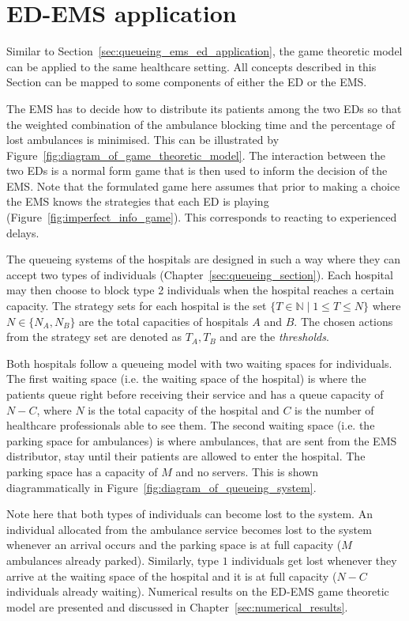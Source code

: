 \section{ED-EMS application}\label{sec:game_ems_ed_application}

Similar to Section~\ref{sec:queueing_ems_ed_application}, the game theoretic
model can be applied to the same healthcare setting.
All concepts described in this Section can be mapped to some components of
either the ED or the EMS.

The EMS has to decide how to distribute its patients among the two EDs so that
the weighted combination of the ambulance blocking time and the percentage of
lost ambulances is minimised.
This can be illustrated by Figure~\ref{fig:diagram_of_game_theoretic_model}.
The interaction between the two
EDs is a normal form game that is then used to inform the decision of the EMS.
Note that the formulated game here assumes that prior to making a choice the
EMS knows the strategies that each ED is playing
(Figure~\ref{fig:imperfect_info_game}).
This corresponds to reacting to experienced delays.

The queueing systems of the hospitals are designed in such a way where they can
accept two types of individuals (Chapter~\ref{sec:queueing_section}).
Each hospital may then choose to block type 2 individuals
when the hospital reaches a certain capacity.
The strategy sets for each hospital is the set
\( \{T \in \mathbb{N} \;|\; 1 \leq T \leq N\} \) where \(N \in\{N_A, N_B\}\) are
the total capacities of hospitals \(A\) and \(B\).
The chosen actions from the strategy set are denoted as \(T_A, T_B\) and are
the \textit{thresholds}.

Both hospitals follow a queueing model with two waiting spaces for
individuals.
The first waiting space (i.e. the waiting space of the hospital) is where the
patients queue right before receiving
their service and has a queue capacity of \( N - C \), where \(N\) is the total
capacity of the hospital and \(C\) is the number of healthcare
professionals able to see them.
The second waiting space (i.e. the parking space for ambulances) is where
ambulances, that are sent from the
EMS distributor, stay until their patients are allowed to enter the hospital.
The parking space has a capacity of \(M\) and no servers.
This is shown diagrammatically in Figure~\ref{fig:diagram_of_queueing_system}.

Note here that both types of individuals can become lost to the system.
An individual allocated from the ambulance service becomes lost to the system
whenever
an arrival occurs and the parking space is at full capacity (\(M\)
ambulances already parked).
Similarly, type \(1\) individuals get lost whenever they arrive at the waiting
space of the hospital and it is at full capacity (\(N - C\) individuals already
waiting).
Numerical results on the ED-EMS game theoretic model are presented and
discussed in Chapter~\ref{sec:numerical_results}.

